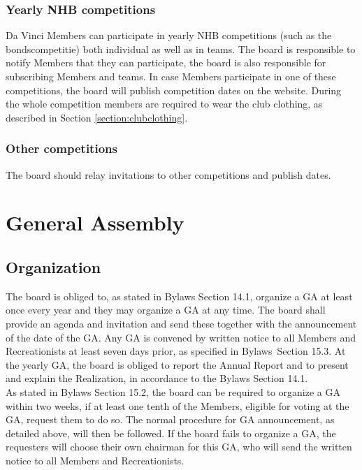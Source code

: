 \documentclass[a4paper]{article}
\newcommand{\Asta}{Bylaws} %
\newcommand{\Ajv}{Annual Report} %
\begin{document}
\subsubsection{Yearly NHB competitions}
Da Vinci { Members} can participate in yearly { NHB} competitions (such as the bondscompetitie) both individual as well as in teams. The board is responsible to notify { Members} that they can participate, the board is also responsible for subscribing { Members} and teams. In case { Members} participate in one of these competitions, the board will publish competition dates on the website. During the whole competition members are required to wear the club clothing, as described in Section \ref{section:clubclothing}.

\subsubsection{Other competitions}
The board should relay invitations to other competitions and publish dates.



\section{General Assembly}
\subsection{Organization}
\label{section:yearlyGA}
The board is obliged to, as stated in { \Asta} Section 14.1, organize a { GA} at least once every year and they may organize a { GA} at any time. The board shall provide an agenda and invitation and send these together with the announcement of the date of the { GA}. Any { GA} is convened by written notice to all { Members} and { Recreationists} at least seven days prior, as specified in \Asta\ Section 15.3. At the yearly { GA}, the board is obliged to report the { \Ajv} and to present and explain the Realization, in accordance to the { \Asta} Section 14.1. \\

As stated in { \Asta} Section 15.2, the board can be required to organize a { GA} within two weeks, if at least one tenth of the { Members}, eligible for voting at the { GA}, request them to do so. The normal procedure for { GA} announcement, as detailed above, will then be followed. If the board fails to organize a { GA}, the requesters will choose their own chairman for this { GA}, who will send the written notice to all { Members} and { Recreationists}. \\
\end{document}
